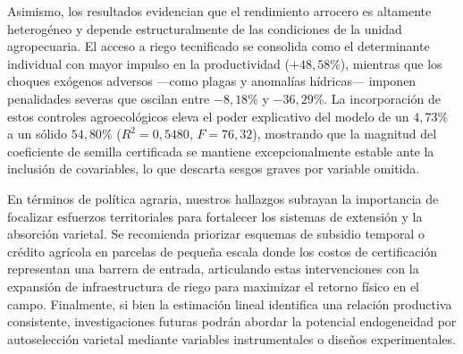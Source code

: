 \documentclass[11pt,a4paper,twocolumn]{article}
\begin{document}
Asimismo, los resultados evidencian que el rendimiento arrocero es altamente heterogéneo y depende estructuralmente de las condiciones de la unidad agropecuaria. El acceso a riego tecnificado se consolida como el determinante individual con mayor impulso en la productividad ($+48{,}58$\%), mientras que los choques exógenos adversos —como plagas y anomalías hídricas— imponen penalidades severas que oscilan entre $-8{,}18$\% y $-36{,}29$\%. La incorporación de estos controles agroecológicos eleva el poder explicativo del modelo de un $4{,}73$\% a un sólido $54{,}80$\% ($R^2 = 0{,}5480$, $F = 76{,}32$), mostrando que la magnitud del coeficiente de semilla certificada se mantiene excepcionalmente estable ante la inclusión de covariables, lo que descarta sesgos graves por variable omitida.

En términos de política agraria, nuestros hallazgos subrayan la importancia de focalizar esfuerzos territoriales para fortalecer los sistemas de extensión y la absorción varietal. Se recomienda priorizar esquemas de subsidio temporal o crédito agrícola en parcelas de pequeña escala donde los costos de certificación representan una barrera de entrada, articulando estas intervenciones con la expansión de infraestructura de riego para maximizar el retorno físico en el campo. Finalmente, si bien la estimación lineal identifica una relación productiva consistente, investigaciones futuras podrán abordar la potencial endogeneidad por autoselección varietal mediante variables instrumentales o diseños experimentales.
\end{document}
